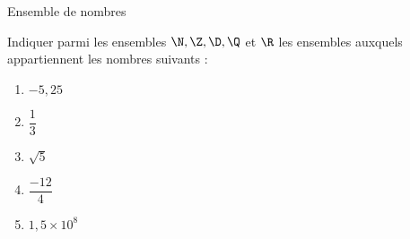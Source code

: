 \documentclass[%
french,onlymath]{beamer}
\begin{document}
\begin{frame}{Ensemble de nombres}

Indiquer parmi les ensembles $\N, \Z, \D, \Q$ et $\R$ les ensembles auxquels appartiennent les nombres suivants :

\begin{enumerate}[\bf 1.]
\item $-5,25$

\item $\dfrac{1}{3}$

\item $\sqrt{5}$

\item $\dfrac{-12}{4}$

\item $1,5\times 10^8$

\end{enumerate}

\end{frame}


\end{document}
